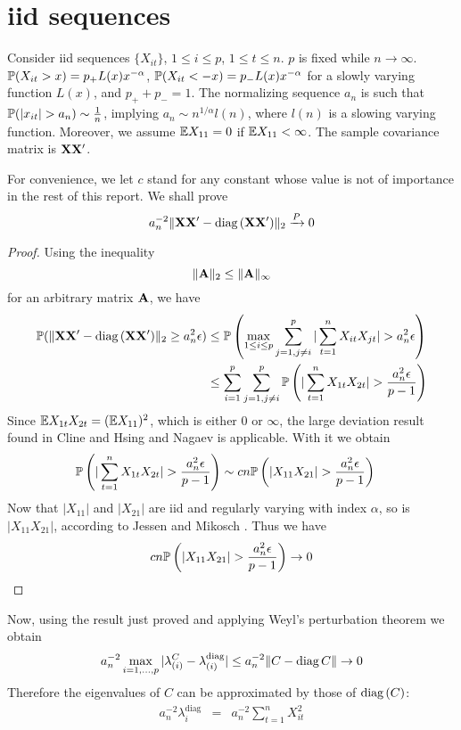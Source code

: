 \documentclass{article}
\begin{document}
\section{iid sequences}\label{sec:iid}
Consider iid sequences $\{X_{it}\}$, $1 \leq i \leq p$, $1 \leq t \leq
n$. $p$ is fixed while $n \to \infty$. $\mathbb{P}(X_{it} > x) = p_+ L(x)
x^{-\alpha}$, $\mathbb{P}(X_{it} < -x) = p_- L(x) x^{-\alpha}$ for a slowly
varying function $L(x)$, and $p_+ + p_- = 1$. The normalizing sequence
$a_n$ is such that $\mathbb{P}(|x_{it}| > a_n) \sim {1 \over n}$, implying
$a_n \sim n^{1/\alpha} l(n)$, where $l(n)$ is a slowing varying
function. Moreover, we assume $\mathbb{E} X_{11} = 0$ if $\mathbb{E} X_{11} <
\infty$. The sample covariance matrix is $\mathbf{XX'}$.

For convenience, we let $c$ stand for any constant whose value is not
of importance in the rest of this report. We shall prove
\[
a_n^{-2}\|\mathbf{XX'} - \text{diag\,}(\mathbf{XX'})\|_2 \xrightarrow{P} 0
\]

\begin{proof}
  Using the inequality
  \[
  \|\mathbf{A}\|_2 \leq \|\mathbf{A}\|_\infty
  \]
  for an arbitrary matrix $\mathbf{A}$, we have
  \begin{align*}
    \mathbb{P}(\|\mathbf{XX'} - \text{diag\,}(\mathbf{XX'})\|_2 \geq a_n^2 \epsilon) & \leq
    \mathbb{P}\left(\max_{1\leq i \leq p} \sum_{j=1, j\neq i}^p |\sum_{t=1}^n
    X_{it} X_{jt}| > a_n^2 \epsilon\right) \\
    &\leq \sum_{i=1}^p \sum_{j=1, j\neq i}^p \mathbb{P}\left(|\sum_{t=1}^n
    X_{1t} X_{2t}| > {a_n^2 \epsilon \over p-1}\right) \\
  \end{align*}
  Since $\mathbb{E} X_{1t} X_{2t} = (\mathbb{E} X_{11})^2$, which is either 0 or
  $\infty$, the large deviation result found in Cline and Hsing
  \cite{ClingHsing1998} and Nagaev \cite{nagaev1979} is
  applicable. With it we obtain
  \begin{align*}
    \mathbb{P}\left(|\sum_{t=1}^n X_{1t} X_{2t}| > {a_n^2 \epsilon \over p-1}\right) &\sim
    c n \mathbb{P}\left(|X_{11} X_{21}| > {a_n^2 \epsilon \over p-1 }\right)
  \end{align*}
  Now that $|X_{11}|$ and $|X_{21}|$ are iid and regularly varying
  with index $\alpha$, so is $|X_{11} X_{21}|$, according to Jessen
  and Mikosch \cite{JessenMikosch2006}. Thus we have
  \[
  c n \mathbb{P}\left(|X_{11} X_{21}| > {a_n^2 \epsilon \over p-1 }\right)
  \to 0
  \]
\end{proof}
Now, using the result just proved and applying Weyl's perturbation
theorem we obtain
\[
a_n^{-2} \max_{i=1,\dots,p} |\lambda^C_{(i)} -
\lambda^{\text{diag}}_{(i)}| \leq  a_n^{-2}\|C - \text{diag\,}{C}\| \to 0
\]
Therefore the eigenvalues of $C$ can be approximated by those of
$\text{diag\,}(C)$:
\begin{eqnarray*}
a_n^{-2}\lambda^{\text{diag}}_{i}  &=& a_n^{-2} \sum_{t=1}^n X_{it}^2
\end{eqnarray*}
\end{document}
